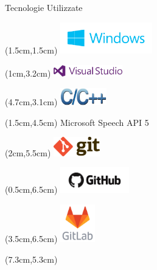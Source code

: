 \documentclass{beamer}
\begin{document}
	\begin{frame}{Tecnologie Utilizzate}
		\begin{textblock*}{5cm}(1.5cm,1.5cm) %
			\includegraphics[width=4cm]{images/windows-logo}
		\end{textblock*}
		\begin{textblock*}{5cm}(1cm,3.2cm) %
			\includegraphics[width=3cm]{images/visualstudio-logo}
		\end{textblock*}
		\begin{textblock*}{5cm}(4.7cm,3.1cm) %
			\includegraphics[width=2cm]{images/c_cplusplus}
		\end{textblock*}
		\begin{textblock*}{4cm}(1.5cm,4.5cm) %
			Microsoft Speech API 5
		\end{textblock*}
		\begin{textblock*}{5cm}(2cm,5.5cm) %
			\includegraphics[width=2cm]{images/git-logo}
		\end{textblock*}
		\begin{textblock*}{5cm}(0.5cm,6.5cm) %
			\includegraphics[width=3cm]{images/github-logo}
		\end{textblock*}
		\begin{textblock*}{5cm}(3.5cm,6.5cm) %
			\includegraphics[width=1.5cm]{images/gitlab}
		\end{textblock*}
		\begin{textblock*}{5cm}(7.3cm,5.3cm) %

\end{textblock*}
\end{frame}
\end{document}
